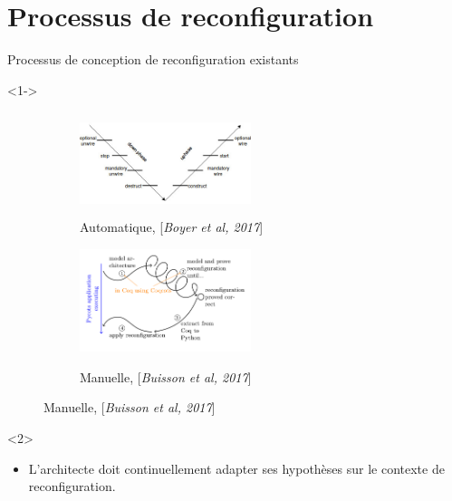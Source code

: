 \section{Processus de reconfiguration} 

\begin{frame}{Processus de conception de reconfiguration existants}
\begin{onlyenv}<1->
\begin{figure}
\begin{subfigure}[b]{0.45\textwidth} %
\includegraphics[width= 5cm, height=3cm ]{imgs/boyer}
\caption{Automatique, [\emph{Boyer et al, 2017}]}\label{fig:orchid}
\end{subfigure}
\begin{subfigure}[b]{0.45\textwidth} %
\includegraphics[width=5cm]{imgs/buisson_approche}\\
\caption{Manuelle, [\emph{Buisson et al, 2017}]}\label{fig:orchid}
\end{subfigure}
\end{figure}
\end{onlyenv}
\begin{onlyenv}<2>
\begin{block}{}
\begin{itemize}
    \item   L'architecte doit continuellement adapter ses hypothèses sur le contexte de reconfiguration.
\end{itemize}
\end{block}
\end{onlyenv}
\end{frame}


